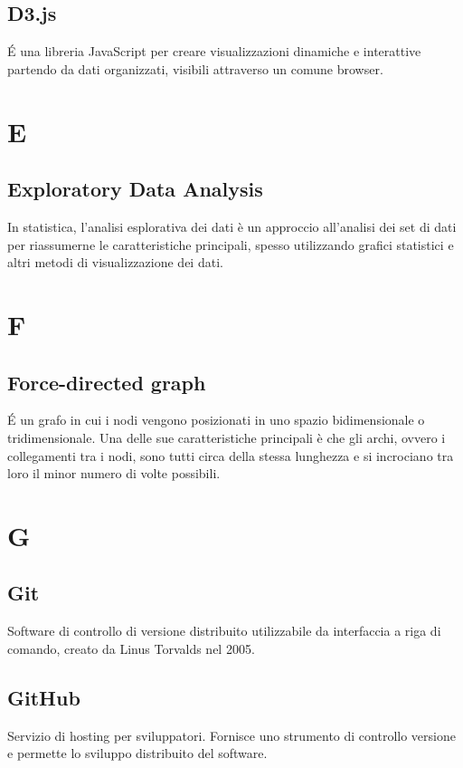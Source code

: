 \subsection{D3.js}
\'E una libreria JavaScript per creare visualizzazioni dinamiche e interattive partendo da dati organizzati, visibili attraverso un comune browser.

\newpage
\section{E}
\subsection{Exploratory Data Analysis}
In statistica, l'analisi esplorativa dei dati è un approccio all'analisi dei set di dati per riassumerne le caratteristiche principali, spesso utilizzando grafici statistici e altri metodi di visualizzazione dei dati.

\newpage
\section{F}
\subsection{Force-directed graph}
\'E un grafo in cui i nodi vengono posizionati in uno spazio bidimensionale o tridimensionale. Una delle sue caratteristiche principali è che gli archi, ovvero i collegamenti tra i nodi, sono tutti circa della stessa lunghezza e si incrociano tra loro il minor numero di volte possibili.

\newpage
\section{G}
\subsection{Git}
Software di controllo di versione distribuito utilizzabile da interfaccia a riga di comando, creato da Linus Torvalds nel 2005.

\subsection{GitHub}
Servizio di hosting per sviluppatori. Fornisce uno strumento di controllo versione e permette lo sviluppo distribuito del software.

